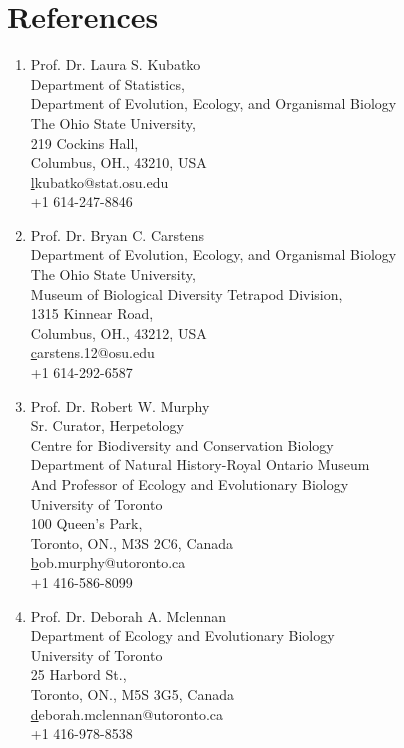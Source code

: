 \documentclass[11pt]{article}
\begin{document}
\section*{References}

\begin{enumerate}

\item Prof. Dr. Laura S. Kubatko\\
Department of Statistics,\\
Department of Evolution, Ecology, and Organismal Biology\\
The Ohio State University,\\
219 Cockins Hall,\\
Columbus, OH., 43210, USA\\
\href{lkubatko@stat.osu.edu}lkubatko@stat.osu.edu\\
+1 614-247-8846\\

\item Prof. Dr. Bryan C. Carstens\\
Department of Evolution, Ecology, and Organismal Biology\\
The Ohio State University,\\
Museum of Biological Diversity Tetrapod Division, \\
1315 Kinnear Road, \\
Columbus, OH., 43212, USA\\ 
\href{carstens.12@osu.edu}carstens.12@osu.edu\\
+1 614-292-6587\\

\item Prof. Dr. Robert W. Murphy\\
Sr. Curator, Herpetology\\
Centre for Biodiversity and Conservation Biology\\
Department of Natural History-Royal Ontario Museum\\
And Professor of Ecology and Evolutionary Biology\\ 
University of Toronto\\
100 Queen’s Park,\\
Toronto, ON., M3S 2C6, Canada\\
\href{bob.murphy@utoronto.ca}bob.murphy@utoronto.ca\\
+1 416-586-8099

\item Prof. Dr. Deborah A. Mclennan\\
Department of Ecology and Evolutionary Biology\\
University of Toronto\\
25 Harbord St.,\\
Toronto, ON., M5S 3G5, Canada \\
\href{deborah.mclennan@utoronto.ca}deborah.mclennan@utoronto.ca
\\+1 416-978-8538



\end{enumerate}









\end{document}
